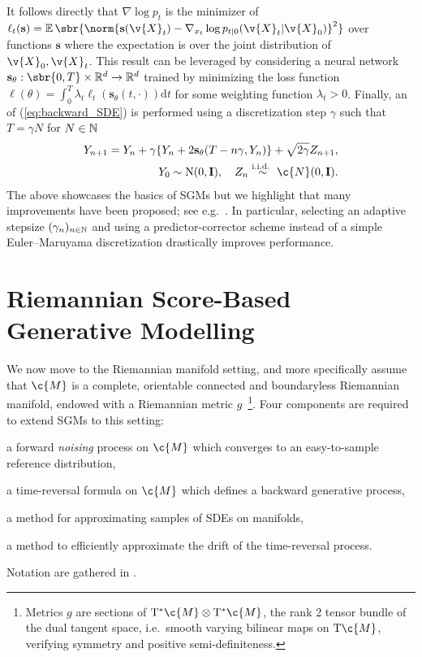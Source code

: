 It follows directly that $\nabla \log p_t$ is the minimizer of $\ell_t(\mathbf{s}) = \E\sbr{\norm{\mathbf{s}(\v{X}_t) - \nabla_{x_t} \log p_{t|0}(\v{X}_t|\v{X}_0)}^2}$ over functions $\mathbf{s}$ where the expectation is over the joint distribution of $\v{X}_0,\v{X}_t$.
This result can be leveraged by considering a neural network $\mathbf{s}_\theta: \sbr{0,T} \times \R^d \to \R^d$ trained by minimizing the loss function $\ell(\theta)=\int_0^T \lambda_t \ell_{t}(\mathbf{s}_\theta(t,\cdot))\mathrm{d} t$ for some weighting function $\lambda_t>0$.
Finally, an  of (\ref{eq:backward_SDE}) is performed using a discretization step $\gamma$ such that $T=\gamma N$ for $N \in \mathbb{N}$ \begin{align} \label{eq:backward_discrete_final} Y_{n+1} = Y_n + \gamma \{Y_n + 2 \mathbf{s}_\theta(T -n \gamma, Y_n) \} + \sqrt{2 \gamma} Z_{n+1}, \\ Y_0\sim \mathrm{N}(0,\m{I}), \quad Z_n \overset{\textup{i.i.d.
		}}{\sim} \c{N}(0,\m{I}). \nonumber
\end{align}
The above showcases the basics of SGMs but we highlight that many improvements have been proposed; see e.g.~\textcite{song2020improved,jolicoeur2020adversarial,nichol2021beatgans}.
In particular, selecting an adaptive stepsize $(\gamma_n)_{n \in \mathbb{N}}$ \parencite{bao2022analyticdpm,watson2021learning} and using a predictor-corrector scheme \parencite{song2020score} instead of a simple Euler--Maruyama discretization drastically improves performance.

\section{Riemannian Score-Based Generative Modelling}

\label{sec:score-appr-manif}
We now move to the Riemannian manifold setting, and more specifically assume that $\c{M}$ is a complete, orientable connected and boundaryless Riemannian manifold, endowed with a Riemannian metric $g$~\footnote{ Metrics $g$ are sections of $\mathrm{T}^* \c{M} \otimes \mathrm{T}^* \c{M}$, the rank 2 tensor bundle of the dual tangent space, i.e.\ smooth varying bilinear maps on $\mathrm{T} \c{M}$, verifying symmetry and positive semi-definiteness.
}.
Four components are required to extend SGMs to this setting: \begin{enumerate*}[label=\roman*)] \item a forward \emph{noising} process on $\c{M}$ which converges to an easy-to-sample reference distribution, \item a time-reversal formula on $\c{M}$ which defines a backward generative process, \item a method for approximating samples of SDEs on manifolds, \item a method to efficiently approximate the drift of the time-reversal process.
\end{enumerate*}
Notation are gathered in .

